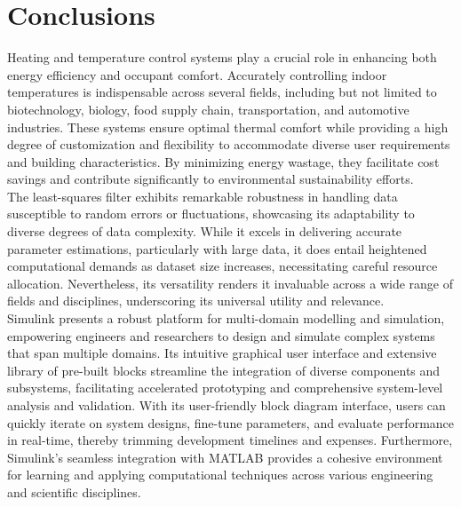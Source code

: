 \section{Conclusions}
Heating and temperature control systems play a crucial role in enhancing both energy efficiency and occupant comfort. Accurately controlling indoor temperatures is indispensable across several fields, including but not limited to biotechnology, biology, food supply chain, transportation, and automotive industries. These systems ensure optimal thermal comfort while providing a high degree of customization and flexibility to accommodate diverse user requirements and building characteristics. By minimizing energy wastage, they facilitate cost savings and contribute significantly to environmental sustainability efforts. \\

The least-squares filter exhibits remarkable robustness in handling data susceptible to random errors or fluctuations, showcasing its adaptability to diverse degrees of data complexity. While it excels in delivering accurate parameter estimations, particularly with large data, it does entail heightened computational demands as dataset size increases, necessitating careful resource allocation. Nevertheless, its versatility renders it invaluable across a wide range of fields and disciplines, underscoring its universal utility and relevance. \\

Simulink presents a robust platform for multi-domain modelling and simulation, empowering engineers and researchers to design and simulate complex systems that span multiple domains. Its intuitive graphical user interface and extensive library of pre-built blocks streamline the integration of diverse components and subsystems, facilitating accelerated prototyping and comprehensive system-level analysis and validation. With its user-friendly block diagram interface, users can quickly iterate on system designs, fine-tune parameters, and evaluate performance in real-time, thereby trimming development timelines and expenses. Furthermore, Simulink's seamless integration with MATLAB provides a cohesive environment for learning and applying computational techniques across various engineering and scientific disciplines.
